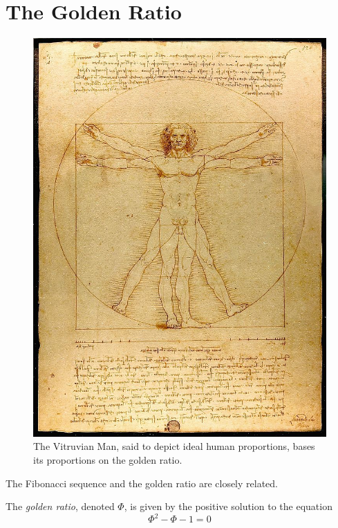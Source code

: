 \section{The Golden Ratio}

\begin{figure}[ht]
  \begin{center}
  \includegraphics{fibonacci/vitruvian.jpg}
  \end{center}
  \caption{The Vitruvian Man, said to depict ideal human proportions, bases its proportions on the golden ratio.}%
\end{figure}


The Fibonacci sequence and the golden ratio are closely related.

\begin{defn}
  The \emph{golden ratio}, denoted \( \Phi \), is given by the positive solution to the equation
\begin{equation}
  \Phi^2 - \Phi - 1 = 0
\end{equation}
\end{defn}

